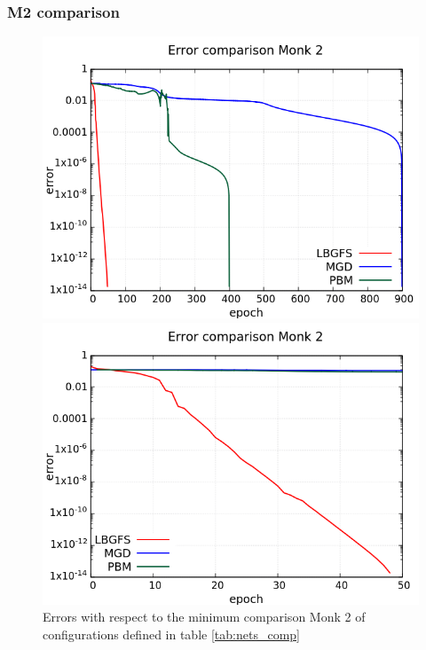 \subsubsection{M2 comparison}


\begin{figure}[H]
	\centering
	\begin{minipage}[t]{0.5\linewidth}
		\includegraphics[width=\linewidth]{data/Comparison/Monk2/Monk2_R_Comparison_log_standard.png}
	\end{minipage}%
	\begin{minipage}[t]{0.5\linewidth}
		\includegraphics[width=\linewidth]{data/Comparison/Monk2/Monk2_R_Comparison_log_zoom.png}
	\end{minipage}
	\caption{Errors with respect to the minimum comparison Monk 2 of configurations defined in table \ref{tab:nets_comp}}
	\label{R-Monk2}
\end{figure}

